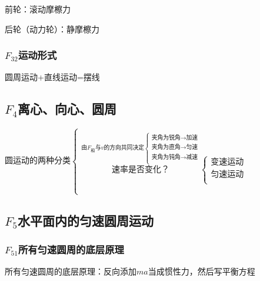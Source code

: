\documentclass[lang=cn,10pt]{elegantbook}
\begin{document}
        前轮：滚动摩檫力
        
        后轮（动力轮）：静摩檫力
        
         \subsubsection{$F_{32}$运动形式}
         
         圆周运动+直线运动=摆线
         
         \subsection{$F_4$离心、向心、圆周}
         $ \text{圆运动的两种分类}\begin{cases}
         	\overset{}{\overset{\overset{}{\text{由}F_和\text{与}v\text{的方向共同决定}\begin{cases}
         					\text{夹角为锐角}\rightarrow \text{加速}\\
         					\text{夹角为直角}\rightarrow \text{匀速}\\
         					\text{夹角为钝角}\rightarrow \text{减速}\\
         		\end{cases}}}{\text{速率是否变化？}}\begin{cases}
         			\text{变速运动}\\
         			\text{匀速运动}\\
         	\end{cases}}\\
         	\mathop {\underset{\text{由供(}\mathbb{F} _{\text{合}}\text{法向分量)需(m}\frac{v^2}{r})\text{关系决定}}{\text{半径是否变化？}}\begin{cases}
         			\text{供}>\text{需}\rightarrow \text{近心运动}\\
         			\text{供}<\text{需}\rightarrow \text{离心运动}\\
         			\text{供}=\text{需}\rightarrow \text{圆周运动}\\
         	\end{cases}} \limits_{}\\
         \end{cases}$
         \subsection{$F_5$水平面内的匀速圆周运动}
         \subsubsection{$F_{51}$所有匀速圆周的底层原理}
         所有匀速圆周的底层原理：反向添加$ma$当成惯性力，然后写平衡方程
        \vspace{6cm}
        
\end{document}
